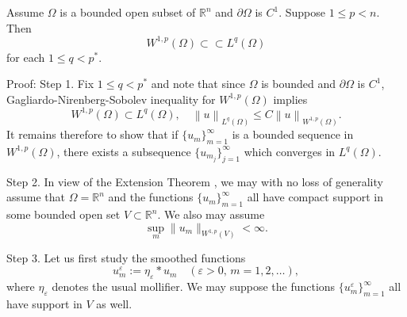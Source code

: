 \begin{theorem}
    \label{thm:rellich-kondrachov}
    Assume \( \Omega \) is a bounded open subset of \( \mathbb{R}^n \) and \( \partial \Omega \) is \( C^1 \). Suppose \( 1 \leq p < n \). Then
    \[
        W^{1,p}\left(\Omega\right) \subset \subset L^q\left(\Omega\right)
    \]
    for each \( 1 \leq q < p^* \).

    Proof:
    Step 1. Fix \( 1 \leq q < p^* \) and note that since \( \Omega \) is bounded and $\partial \Omega$ is $C^1$, Gagliardo-Nirenberg-Sobolev inequality for $W^{1,p}\left(\Omega\right)$ implies
    \[
        W^{1,p}\left(\Omega\right) \subset L^q\left(\Omega\right), \quad \left\|u\right\|_{L^q\left(\Omega\right)} \leq C \left\|u\right\|_{W^{1,p}\left(\Omega\right)}.
    \]
    It remains therefore to show that if \(\{u_m\}_{m=1}^{\infty}\) is a bounded sequence in \( W^{1,p}\left(\Omega\right) \), there exists a subsequence \(\{u_{m_j}\}_{j=1}^{\infty}\) which converges in \( L^q\left(\Omega\right) \).

    Step 2. In view of the Extension Theorem , we may with no loss of generality assume that \( \Omega = \mathbb{R}^n \) and the functions \(\{u_m\}_{m=1}^{\infty}\) all have compact support in some bounded open set \( V \subset \mathbb{R}^n \). We also may assume
    \[
        \sup_m \|u_m\|_{W^{1,p}(V)} < \infty.
    \]

    Step 3. Let us first study the smoothed functions
    \[
        u_m^\varepsilon := \eta_\varepsilon * u_m \quad (\varepsilon > 0, \, m = 1, 2, \ldots),
    \]
    where \(\eta_\varepsilon\) denotes the usual mollifier. We may suppose the functions \(\{u_m^\varepsilon\}_{m=1}^{\infty}\) all have support in \( V \) as well.


\end{theorem}
